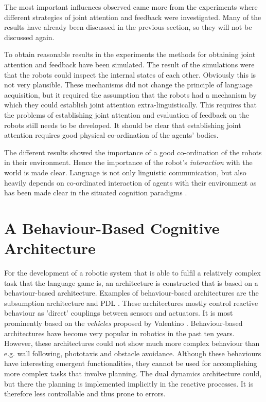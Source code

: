 The most important influences observed came more from the experiments where different strategies of joint attention and feedback were investigated. Many of the results have already been discussed in the previous section, so they will not be discussed again.  

To obtain reasonable results in the experiments the methods for obtaining joint attention and feedback have been simulated. The result of the simulations were that the robots could inspect the internal states of each other. Obviously this is not very plausible. These mechanisms did not change the principle of language acquisition, but it required the assumption that the robots had a mechanism by which they could establish joint attention extra-linguistically. This requires that the problems of establishing joint attention and evaluation of feedback on the robots still needs to be developed. It should be clear that establishing joint attention requires good physical co-ordination of the agents' bodies.


The different results showed the importance of a good co-ordination of the robots in their environment. Hence the importance of the robot's {\em interaction} with the world is made clear. Language is not only linguistic communication, but also heavily depends on co-ordinated interaction of agents with their environment as has been made clear in the situated cognition paradigms \citep{clancey:1997}.

\section{A Behaviour-Based Cognitive Architecture}

For the development of a robotic system that is able to fulfil a relatively complex task that the language game is, an architecture is constructed that is based on a behaviour-based architecture. Examples of behaviour-based architectures are the subsumption architecture \citep{brooks:1990} and PDL \citep{steels:1994b}. These architectures mostly control reactive behaviour as 'direct' couplings between sensors and actuators. It is most prominently based on the {\em vehicles} proposed by Valentino \citet{braitenberg:1984}. Behaviour-based architectures have become very popular in robotics in the past ten years. However, these architectures could not show much more complex behaviour than e.g. wall following, phototaxis and obstacle avoidance. Although these behaviours have interesting emergent functionalities, they cannot be used for accomplishing more complex tasks that involve planning. The dual dynamics architecture \citep{jaeger:1997} could, but there the planning is implemented implicitly in the reactive processes. It is therefore less controllable and thus prone to errors.

